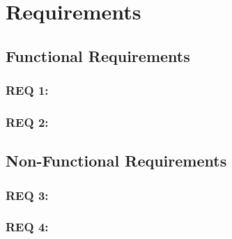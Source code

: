 %
%

\chapter{Requirements}
\label{chap:Requirements}


\section{Functional Requirements}
\label{sec:Functional Requirements}

\subsection*{REQ 1:}
\label{subsec:REQ 1:}

\subsection*{REQ 2:}
\label{subsec:REQ 2:}


\section{Non-Functional Requirements}
\label{sec:Non-Functional Requirements}

\subsection*{REQ 3:}
\label{subsec:REQ 3:}

\subsection*{REQ 4:}
\label{subsec:REQ 4:}